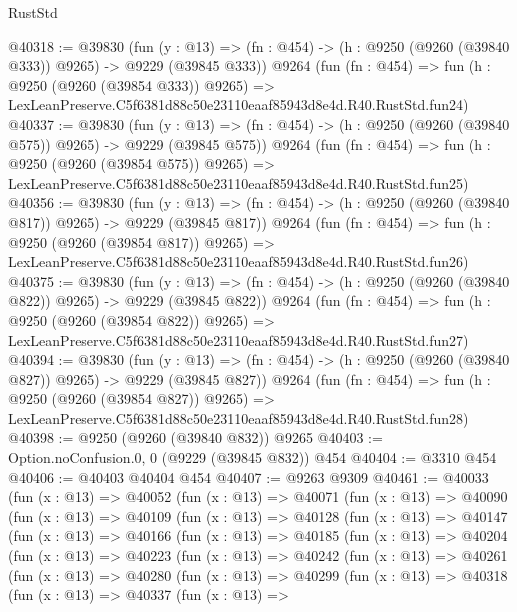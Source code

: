 \begin{lexlean}{RustStd}
\begin{coremodule}
@40318 := @39830
    (fun (y : @13) => (fn : @454) -> (h : @9250 (@9260 (@39840 @333)) @9265) -> @9229 (@39845 @333))
    @9264
    (fun (fn : @454) =>
    fun (h : @9250 (@9260 (@39854 @333)) @9265) =>
    LexLeanPreserve.C5f6381d88c50e23110eaaf85943d8e4d.R40.RustStd.fun24)
@40337 := @39830
    (fun (y : @13) => (fn : @454) -> (h : @9250 (@9260 (@39840 @575)) @9265) -> @9229 (@39845 @575))
    @9264
    (fun (fn : @454) =>
    fun (h : @9250 (@9260 (@39854 @575)) @9265) =>
    LexLeanPreserve.C5f6381d88c50e23110eaaf85943d8e4d.R40.RustStd.fun25)
@40356 := @39830
    (fun (y : @13) => (fn : @454) -> (h : @9250 (@9260 (@39840 @817)) @9265) -> @9229 (@39845 @817))
    @9264
    (fun (fn : @454) =>
    fun (h : @9250 (@9260 (@39854 @817)) @9265) =>
    LexLeanPreserve.C5f6381d88c50e23110eaaf85943d8e4d.R40.RustStd.fun26)
@40375 := @39830
    (fun (y : @13) => (fn : @454) -> (h : @9250 (@9260 (@39840 @822)) @9265) -> @9229 (@39845 @822))
    @9264
    (fun (fn : @454) =>
    fun (h : @9250 (@9260 (@39854 @822)) @9265) =>
    LexLeanPreserve.C5f6381d88c50e23110eaaf85943d8e4d.R40.RustStd.fun27)
@40394 := @39830
    (fun (y : @13) => (fn : @454) -> (h : @9250 (@9260 (@39840 @827)) @9265) -> @9229 (@39845 @827))
    @9264
    (fun (fn : @454) =>
    fun (h : @9250 (@9260 (@39854 @827)) @9265) =>
    LexLeanPreserve.C5f6381d88c50e23110eaaf85943d8e4d.R40.RustStd.fun28)
@40398 := @9250 (@9260 (@39840 @832)) @9265
@40403 := Option.noConfusion.{0, 0} (@9229 (@39845 @832)) @454
@40404 := @3310 @454
@40406 := @40403 @40404 @454
@40407 := @9263 @9309
@40461 := @40033
    (fun (x : @13) =>
    @40052
      (fun (x : @13) =>
      @40071
        (fun (x : @13) =>
        @40090
          (fun (x : @13) =>
          @40109
            (fun (x : @13) =>
            @40128
              (fun (x : @13) =>
              @40147
                (fun (x : @13) =>
                @40166
                  (fun (x : @13) =>
                  @40185
                    (fun (x : @13) =>
                    @40204
                      (fun (x : @13) =>
                      @40223
                        (fun (x : @13) =>
                        @40242
                          (fun (x : @13) =>
                          @40261
                            (fun (x : @13) =>
                            @40280
                              (fun (x : @13) =>
                              @40299
                                (fun (x : @13) =>
                                @40318
                                  (fun (x : @13) =>
                                  @40337
                                    (fun (x : @13) =>

\end{coremodule}
\end{lexlean}
